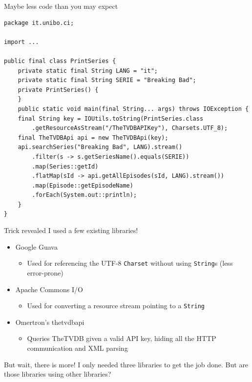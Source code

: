\documentclass[presentation]{beamer}
\begin{document}
\begin{frame}[fragile]{Maybe less code than you may expect}
  \begin{block}{}
    \begin{verbatim}
package it.unibo.ci;

import ...

public final class PrintSeries {
    private static final String LANG = "it";
    private static final String SERIE = "Breaking Bad";
    private PrintSeries() {
    }
    public static void main(final String... args) throws IOException {
	final String key = IOUtils.toString(PrintSeries.class
		.getResourceAsStream("/TheTVDBAPIKey"), Charsets.UTF_8);
	final TheTVDBApi api = new TheTVDBApi(key);
	api.searchSeries("Breaking Bad", LANG).stream()
		.filter(s -> s.getSeriesName().equals(SERIE))
		.map(Series::getId)
		.flatMap(sId -> api.getAllEpisodes(sId, LANG).stream())
		.map(Episode::getEpisodeName)
		.forEach(System.out::println);
    }
}
    \end{verbatim}
  \end{block}
\end{frame}

\begin{frame}[fragile]{Trick revealed}
  I used a few existing libraries!
  \begin{itemize}
    \item Google Guava
    \begin{itemize}
      \item Used for referencing the UTF-8 \texttt{Charset} without using \texttt{String}s (less error-prone)
    \end{itemize}
    \item Apache Commons I/O
    \begin{itemize}
      \item Used for converting a resource stream pointing to a \texttt{String} 
    \end{itemize}
    \item Omertron's thetvdbapi
    \begin{itemize}
      \item Queries TheTVDB given a valid API key, hiding all the HTTP communication and XML parsing
    \end{itemize}
  \end{itemize}
  \begin{block}{But wait, there is more!}
    I only needed three libraries to get the job done. But are those libraries using other libraries?
  \end{block}
\end{frame}
\end{document}
